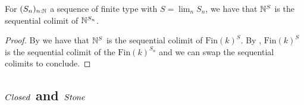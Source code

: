 \begin{corollary}\label{scott-continuity}
  For $(S_n)_{n:\mathbb{N}}$ a sequence of finite type with $S=\lim_nS_n$, we have that $\mathbb{N}^S$ is the sequential colimit of $\mathbb{N}^{S_n}$. 
\end{corollary}
\begin{proof}
  By  we have that $\mathbb{N}^S$ is the sequential colimit of $\mathrm{Fin}(k)^S$. 
  By , $\mathrm{Fin}(k)^S$ is the sequential colimit of the $\mathrm{Fin}(k)^{S_n}$ and we can swap the sequential colimits to conclude.
  \end{proof} 



\subsection{$\Closed$ and $\Stone$}

